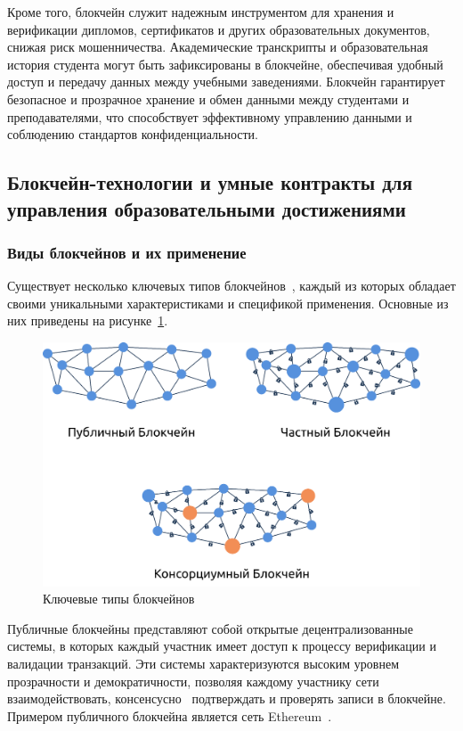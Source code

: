 Кроме того, блокчейн служит надежным инструментом для хранения и верификации дипломов, сертификатов и других образовательных документов, снижая риск мошенничества. Академические транскрипты и образовательная история студента могут быть зафиксированы в блокчейне, обеспечивая удобный доступ и передачу данных между учебными заведениями. Блокчейн гарантирует безопасное и прозрачное хранение и обмен данными между студентами и преподавателями, что способствует эффективному управлению данными и соблюдению стандартов конфиденциальности.

\subsection{Блокчейн-технологии и умные контракты для управления образовательными достижениями}

\subsubsection{Виды блокчейнов и их применение}

Существует несколько ключевых типов блокчейнов~\cite{bib:types_of_blockchains}, каждый из которых обладает своими уникальными характеристиками и спецификой применения. Основные из них приведены на рисунке~\ref{fig:types_of_blockchains}.

\begin{figure}[H]   
	\centering
	\includegraphics[width=\textwidth]{images/1.types_of_blockchains.png}
	\parskip=6pt
	\caption{Ключевые типы блокчейнов}
	\label{fig:types_of_blockchains}
\end{figure}

Публичные блокчейны представляют собой открытые децентрализованные системы, в которых каждый участник имеет доступ к процессу верификации и валидации транзакций. Эти системы характеризуются высоким уровнем прозрачности и демократичности, позволяя каждому участнику сети взаимодействовать, консенсусно~\cite{bib:consensus} подтверждать и проверять записи в блокчейне. Примером публичного блокчейна является сеть Ethereum~\cite{bib:ethereum}.

